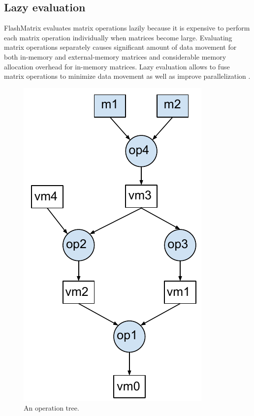 \subsection{Lazy evaluation} \label{sec:lazy_eval}
FlashMatrix evaluates matrix operations lazily because it is expensive to
perform each matrix operation individually when matrices become large.
Evaluating matrix operations separately causes significant amount of data
movement for both in-memory and external-memory matrices and considerable
memory allocation overhead for in-memory matrices. Lazy evaluation allows
to fuse matrix operations to minimize data movement as well as improve
parallelization \cite{Ching12}.

\begin{figure}
	\centering
	\includegraphics[scale=0.5]{./DAG.pdf}
	\caption{An operation tree.}
	\label{fig:DAG}
\end{figure}


